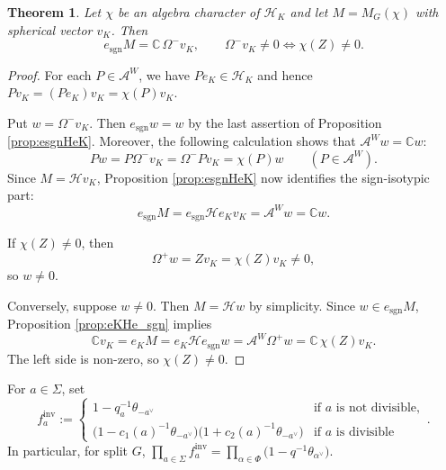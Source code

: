 \documentclass[12pt]{article}
\numberwithin{equation}{section}
\newtheorem{theorem}{Theorem}[section]
\theoremstyle{definition}
\theoremstyle{remark}
\theoremstyle{plain}
\begin{document}
\begin{theorem}\label{thm:genericity_Z}
Let $\chi$ be an algebra character of $\mathcal{H}_K$ and let $M = M_G(\chi)$ with spherical vector $v_K$. Then
$$e_{\mathrm{sgn}} M = \mathbb{C}\,\Omega^{-} v_K, \qquad \Omega^{-}v_K \neq 0 \iff \chi(Z) \neq 0.$$
\end{theorem}
\begin{proof}
For each $P\in\mathcal A^W$, we have $Pe_K\in\mathcal H_K$ and hence $Pv_K=(Pe_K)v_K=\chi(P)v_K$.

Put $w=\Omega^-v_K$. Then $e_{\mathrm{sgn}}w = w$ by the last assertion of Proposition \ref{prop:esgnHeK}. Moreover, the following calculation shows that $\mathcal A^Ww = \mathbb Cw$:
$$Pw=P\Omega^-v_K=\Omega^-Pv_K=\chi(P)w \qquad (P\in\mathcal A^W).$$
Since $M=\mathcal Hv_K$, Proposition \ref{prop:esgnHeK} now identifies the sign-isotypic part:
$$e_{\mathrm{sgn}}M=e_{\mathrm{sgn}}\mathcal He_Kv_K=\mathcal A^Ww=\mathbb Cw.$$

If $\chi(Z)\neq0$, then
$$\Omega^+w=Zv_K=\chi(Z)v_K\neq0,$$
so $w\neq0$.

Conversely, suppose $w\neq0$. Then $M=\mathcal Hw$ by simplicity. Since $w\in e_{\mathrm{sgn}}M$, Proposition \ref{prop:eKHe_sgn} implies
$$\mathbb Cv_K=e_KM=e_K\mathcal He_{\mathrm{sgn}}w=\mathcal A^W\Omega^+w=\mathbb C\,\chi(Z)v_K.$$
The left side is non-zero, so $\chi(Z)\neq0$.
\end{proof}

For $a\in\Sigma$, set
$$f_a^{\mathrm{inv}}:=\begin{cases}
1-q_a^{-1}\theta_{-a^\vee} & \text{if }a\text{ is not divisible},\\[2pt]
\big(1-c_1(a)^{-1}\theta_{-a^\vee}\big)\big(1+c_2(a)^{-1}\theta_{-a^\vee}\big) & \text{if }a\text{ is divisible}
\end{cases}.$$
In particular, for split $G$, $\prod_{a\in\Sigma}f_a^{\mathrm{inv}}=\prod_{\alpha\in\Phi}\big(1-q^{-1}\theta_{\alpha^\vee}\big)$.
\end{document}
